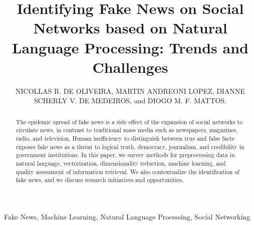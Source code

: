 \documentclass{ieeeaccess}
\begin{document}

\title{Identifying Fake News on Social Networks based on Natural Language Processing: Trends and Challenges}

\author{\uppercase{Nicollas R. de Oliveira},
\uppercase{Martin Andreoni Lopez}, \uppercase{Dianne Scherly V. de Medeiros}, and \uppercase{Diogo M. F. Mattos}.
}
\address[1]{LabGen / MídiaCom -- PPGEET/TCE/IC/UFF\\Universidade Federal Fluminense (UFF) -- Niter\'{o}i, RJ, Brazil}
\address[2]{Technology Innovation Institute (TII)}



\begin{abstract}
The epidemic spread of fake news is a side effect of the expansion of social networks to circulate news, in contrast to traditional mass media such as newspapers, magazines, radio, and television. Human inefficiency to distinguish between true and false facts exposes fake news as a threat to logical truth, democracy, journalism, and credibility in government institutions. In this paper, we survey methods for preprocessing data in natural language, vectorization, dimensionality reduction, machine learning, and quality assessment of information retrieval. We also contextualize the identification of fake news, and we discuss research initiatives and opportunities.
\end{abstract}

\begin{keywords}
Fake News, Machine Learning, Natural Language Processing, Social Networking
\end{keywords}

\titlepgskip=-15pt

\maketitle
\end{document}
